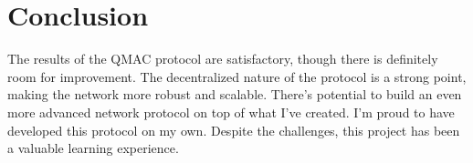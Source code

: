 \section*{Conclusion}

The results of the QMAC protocol are satisfactory, though there is definitely room for improvement. The decentralized nature of the protocol is a strong point, making the network more robust and scalable. There's potential to build an even more advanced network protocol on top of what I've created. I'm proud to have developed this protocol on my own. Despite the challenges, this project has been a valuable learning experience.


